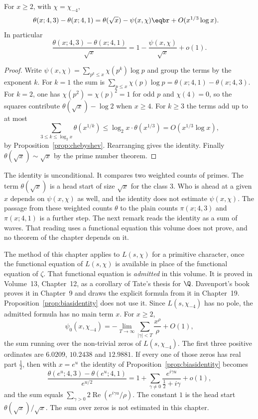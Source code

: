 \begin{proposition}\label{prop:biasidentity}
For $x\ge2$, with $\chi=\chi_{-4}$,
\[
\begin{aligned}\theta(x;4,3)-\theta(x;4,1)&=\theta(\sqrt x)-\psi(x,\chi)\eqbr+O(x^{1/3}\log x).\end{aligned}
\]
In particular
\[
\frac{\theta(x;4,3)-\theta(x;4,1)}{\sqrt x}=1-\frac{\psi(x,\chi)}{\sqrt x}+o(1).
\]
\end{proposition}
\begin{proof}
Write $\psi(x,\chi)=\sum_{p^k\le x}\chi(p^k)\log p$ and group the terms by the exponent $k$. For $k=1$ the sum is $\sum_{p\le x}\chi(p)\log p=\theta(x;4,1)-\theta(x;4,3)$. For $k=2$, one has $\chi(p^2)=\chi(p)^2=1$ for odd $p$ and $\chi(4)=0$, so the squares contribute $\theta(\sqrt x)-\log2$ when $x\ge4$. For $k\ge3$ the terms add up to at most
\[
\sum_{3\le k\le\log_2x}\theta(x^{1/k})\le\log_2x\cdot\theta(x^{1/3})=O(x^{1/3}\log x),
\]
by Proposition~\ref{prop:chebyshev}. Rearranging gives the identity. Finally $\theta(\sqrt x)\sim\sqrt x$ by the prime number theorem.
\end{proof}

The identity is unconditional. It compares two weighted counts of primes. The term $\theta(\sqrt x)$ is a head start of size $\sqrt x$ for the class $3$. Who is ahead at a given $x$ depends on $\psi(x,\chi)$ as well, and the identity does not estimate $\psi(x,\chi)$. The passage from these weighted counts $\theta$ to the plain counts $\pi(x;4,3)$ and $\pi(x;4,1)$ is a further step. The next remark reads the identity as a sum of waves. That reading uses a functional equation this volume does not prove, and no theorem of the chapter depends on it.

\begin{remark}
The method of this chapter applies to $L(s,\chi)$ for a primitive character, once the functional equation of $L(s,\chi)$ is available in place of the functional equation of $\zeta$. That functional equation is \emph{admitted} in this volume. It is proved in Volume~13, Chapter~12, as a corollary of Tate's thesis for $\Q$. Davenport's book proves it in Chapter~9 and draws the explicit formula from it in Chapter~19. Proposition~\ref{prop:biasidentity} does not use it. Since $L(s,\chi_{-4})$ has no pole, the admitted formula has no main term $x$. For $x\ge2$,
\[
\psi_0(x,\chi_{-4})=-\lim_{T\to\infty}\sum_{|\gamma|<T}\frac{x^\rho}\rho+O(1),
\]
the sum running over the non-trivial zeros of $L(s,\chi_{-4})$. The first three positive ordinates are $6.0209$, $10.2438$ and $12.9881$. If every one of those zeros has real part $\frac12$, then with $x=e^u$ the identity of Proposition~\ref{prop:biasidentity} becomes
\[
\frac{\theta(e^u;4,3)-\theta(e^u;4,1)}{e^{u/2}}=1+\sum_{\gamma\neq0}\frac{e^{i\gamma u}}{\frac12+i\gamma}+o(1),
\]
and the sum equals $\sum_{\gamma>0}2\operatorname{Re}(e^{i\gamma u}/\rho)$. The constant $1$ is the head start $\theta(\sqrt x)/\sqrt x$. The sum over zeros is not estimated in this chapter.
\end{remark}


